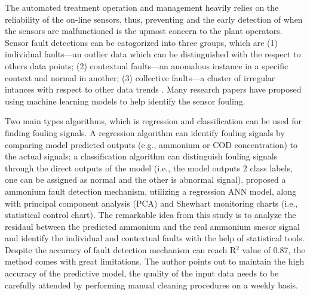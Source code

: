 The automated treatment operation and management heavily relies on the reliability of the on-line sensors, thus, preventing and the early detection of when the sensors are malfunctioned is the upmost concern to the plant operators. Sensor fault detections can be catogorized into three groups, which are (1) individual faults---an outlier data which can be distinguished with the respect to others data points; (2) contextual faults---an anomalous instance in a specific context and normal in another; (3) collective faults---a cluster of irregular intances with respect to other data trends \citep{chandolaAnomalyDetectionSurvey}. Many research papers have proposed using machine learning models to help identify the sensor fouling.

Two main types algorithms, which is regression and classification can be used for finding fouling signals. A regression algorithm can identify fouling signals by comparing model predicted outputs (e.g., ammonium or COD concentration) to the actual signals; a classification algorithm can distinguish fouling signals through the direct outputs of the model (i.e., the model outputs 2 class labels, one can be assigned as normal and the other is abnormal signal). \citet{cecconiSoftSensingOnLine2021} proposed a ammonium fault detection mechanism, utilizing a regression ANN model, along with principal component analysis (PCA) and Shewhart monitoring charts (i.e., statistical control chart). The remarkable idea from this study is to analyze the residaul between the predicted ammonium and the real ammonium snesor signal and identify the individual and contextual faults with the help of statistical tools. Despite the accuracy of fault detection mechanism can reach R$^2$ value of 0.87, the method comes with great limitations. The author points out to maintain the high accuracy of the predictive model, the quality of the input data needs to be carefully attended by performing manual cleaning procedures on a weekly basis. 

